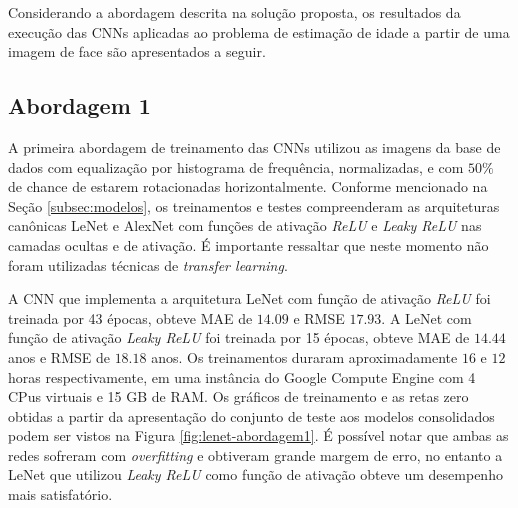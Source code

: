 
Considerando a abordagem descrita na solução proposta, os resultados da execução das CNNs aplicadas ao problema de estimação de idade a partir de uma imagem de face são apresentados a seguir.

%

\subsection{Abordagem 1}%
A primeira abordagem de treinamento das CNNs utilizou as imagens da base de dados com equalização por histograma de frequência, normalizadas, e com $50\%$ de chance de estarem rotacionadas horizontalmente. Conforme mencionado na Seção \ref{subsec:modelos}, os treinamentos e testes compreenderam as arquiteturas canônicas LeNet e AlexNet com funções de ativação \emph{ReLU} e \emph{Leaky ReLU} nas camadas ocultas e de ativação. É importante ressaltar que neste momento não foram utilizadas técnicas de \emph{transfer learning}.

A CNN que implementa a arquitetura LeNet com função de ativação \emph{ReLU} foi treinada por 43 épocas, obteve MAE de $14.09$ e RMSE $17.93$. A LeNet com função de ativação \emph{Leaky ReLU} foi treinada por 15 épocas, obteve MAE de $14.44$ anos e RMSE de $18.18$ anos. Os treinamentos duraram aproximadamente $16$ e $12$ horas respectivamente, em uma instância do Google Compute Engine com 4 CPus virtuais e 15 GB de RAM. Os gráficos de treinamento e as retas zero obtidas a partir da apresentação do conjunto de teste aos modelos consolidados podem ser vistos na Figura \ref{fig:lenet-abordagem1}. É possível notar que ambas as redes sofreram com \emph{overfitting} e obtiveram grande margem de erro, no entanto a LeNet que utilizou \emph{Leaky ReLU} como função de ativação obteve um desempenho mais satisfatório.

